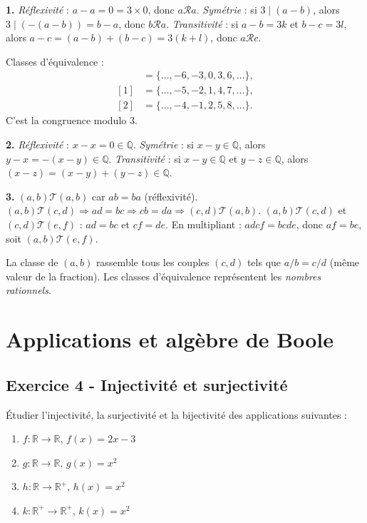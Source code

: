 \documentclass[12pt,a4paper]{article}
\begin{document}
\begin{boitecorrige}
\textbf{1.}
\textit{Réflexivité} : $a-a=0=3\times0$, donc $a\mathcal{R}a$.
\textit{Symétrie} : si $3\mid(a-b)$, alors $3\mid(-(a-b))=b-a$, donc $b\mathcal{R}a$.
\textit{Transitivité} : si $a-b=3k$ et $b-c=3l$, alors $a-c=(a-b)+(b-c)=3(k+l)$, donc $a\mathcal{R}c$.

Classes d'équivalence :
\begin{align*}
[0] &= \{\ldots,-6,-3,0,3,6,\ldots\},\\
[1] &= \{\ldots,-5,-2,1,4,7,\ldots\},\\
[2] &= \{\ldots,-4,-1,2,5,8,\ldots\}.
\end{align*}
C'est la congruence modulo 3.

\textbf{2.}
\textit{Réflexivité} : $x-x=0\in\mathbb{Q}$.
\textit{Symétrie} : si $x-y\in\mathbb{Q}$, alors $y-x=-(x-y)\in\mathbb{Q}$.
\textit{Transitivité} : si $x-y\in\mathbb{Q}$ et $y-z\in\mathbb{Q}$, alors $(x-z)=(x-y)+(y-z)\in\mathbb{Q}$.

\textbf{3.}
$(a,b)\mathcal{T}(a,b)$ car $ab=ba$ (réflexivité).
$(a,b)\mathcal{T}(c,d)\Rightarrow ad=bc\Rightarrow cb=da\Rightarrow(c,d)\mathcal{T}(a,b)$.
$(a,b)\mathcal{T}(c,d)$ et $(c,d)\mathcal{T}(e,f)$ : $ad=bc$ et $cf=de$. En multipliant : $adcf=bcde$, donc $af=be$, soit $(a,b)\mathcal{T}(e,f)$.

La classe de $(a,b)$ rassemble tous les couples $(c,d)$ tels que $a/b=c/d$ (même valeur de la fraction). Les classes d'équivalence représentent les \textit{nombres rationnels}.
\end{boitecorrige}

\section{Applications et algèbre de Boole}

\subsection*{Exercice 4 - Injectivité et surjectivité \niveau{\moyen}}

\begin{boiteexercice}
Étudier l'injectivité, la surjectivité et la bijectivité des applications suivantes :
\begin{enumerate}[label=(\alph*)]
  \item $f:\mathbb{R}\to\mathbb{R}$, $f(x)=2x-3$
  \item $g:\mathbb{R}\to\mathbb{R}$, $g(x)=x^2$
  \item $h:\mathbb{R}\to\mathbb{R}^+$, $h(x)=x^2$
  \item $k:\mathbb{R}^+\to\mathbb{R}^+$, $k(x)=x^2$
\end{enumerate}
\end{boiteexercice}
\end{document}
